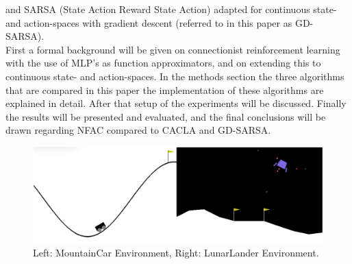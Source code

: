 \cite{van2007reinforcement}
and SARSA (State Action Reward State Action) adapted for continuous state- and action-spaces \cite{nichols2014application} with gradient descent (referred to in this paper as GD-SARSA). \\
First a formal background will be given on connectionist reinforcement learning with the use of MLP's as function approximators,
and on extending this to continuous state- and action-spaces. In the methods section the three algorithms that are compared
 in this paper the implementation of these algorithms are explained in detail. After that setup of the experiments will be discussed.
Finally the results will be presented and evaluated, and the final conclusions will be drawn regarding NFAC compared to CACLA and GD-SARSA.

\begin{figure}[t]
 \centering 
    \includegraphics[width = 0.7\columnwidth]{figs/mountainlunar.png}
 \caption{Left: MountainCar Environment, Right: LunarLander Environment.}
\label{fig:mountainlunar}
\end{figure}
